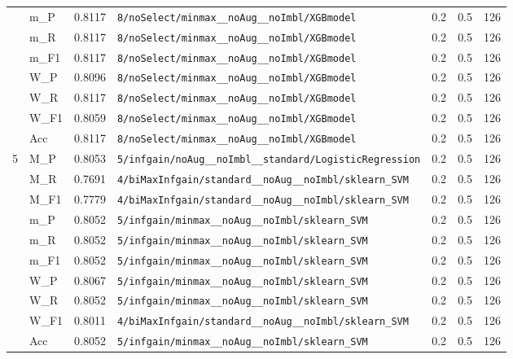 \begin{table}[htbp]
\begin{tabular}{|c|l|c|>{\ttfamily\footnotesize}p{7.2cm}|c|c|c|}
 & m\_P & 0.8117 & \texttt{8/noSelect/minmax\_\_noAug\_\_noImbl/XGBmodel} & 0.2 & 0.5  & 126 \\ 
 & m\_R & 0.8117 & \texttt{8/noSelect/minmax\_\_noAug\_\_noImbl/XGBmodel} & 0.2 & 0.5  & 126 \\ 
 & m\_F1 & 0.8117 & \texttt{8/noSelect/minmax\_\_noAug\_\_noImbl/XGBmodel} & 0.2 & 0.5  & 126 \\ 
 & W\_P & 0.8096 & \texttt{8/noSelect/minmax\_\_noAug\_\_noImbl/XGBmodel} & 0.2 & 0.5  & 126 \\ 
 & W\_R & 0.8117 & \texttt{8/noSelect/minmax\_\_noAug\_\_noImbl/XGBmodel} & 0.2 & 0.5  & 126 \\ 
 & W\_F1 & 0.8059 & \texttt{8/noSelect/minmax\_\_noAug\_\_noImbl/XGBmodel} & 0.2 & 0.5  & 126 \\ 
 & Acc & 0.8117 & \texttt{8/noSelect/minmax\_\_noAug\_\_noImbl/XGBmodel} & 0.2 & 0.5  & 126 \\ 
\hline
\multirow{10}{*}{5} & M\_P & 0.8053 & \texttt{5/infgain/noAug\_\_noImbl\_\_standard/LogisticRegression} & 0.2 & 0.5  & 126 \\ 
 & M\_R & 0.7691 & \texttt{4/biMaxInfgain/standard\_\_noAug\_\_noImbl/sklearn\_SVM} & 0.2 & 0.5  & 126 \\ 
 & M\_F1 & 0.7779 & \texttt{4/biMaxInfgain/standard\_\_noAug\_\_noImbl/sklearn\_SVM} & 0.2 & 0.5  & 126 \\ 
 & m\_P & 0.8052 & \texttt{5/infgain/minmax\_\_noAug\_\_noImbl/sklearn\_SVM} & 0.2 & 0.5  & 126 \\ 
 & m\_R & 0.8052 & \texttt{5/infgain/minmax\_\_noAug\_\_noImbl/sklearn\_SVM} & 0.2 & 0.5  & 126 \\ 
 & m\_F1 & 0.8052 & \texttt{5/infgain/minmax\_\_noAug\_\_noImbl/sklearn\_SVM} & 0.2 & 0.5  & 126 \\ 
 & W\_P & 0.8067 & \texttt{5/infgain/minmax\_\_noAug\_\_noImbl/sklearn\_SVM} & 0.2 & 0.5  & 126 \\ 
 & W\_R & 0.8052 & \texttt{5/infgain/minmax\_\_noAug\_\_noImbl/sklearn\_SVM} & 0.2 & 0.5  & 126 \\ 
 & W\_F1 & 0.8011 & \texttt{4/biMaxInfgain/standard\_\_noAug\_\_noImbl/sklearn\_SVM} & 0.2 & 0.5  & 126 \\ 
 & Acc & 0.8052 & \texttt{5/infgain/minmax\_\_noAug\_\_noImbl/sklearn\_SVM} & 0.2 & 0.5  & 126 \\ 
\hline
\end{tabular}
\end{table}